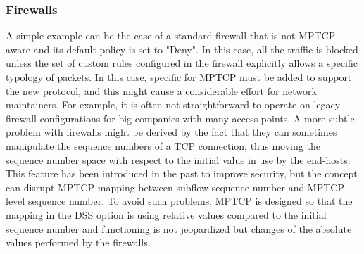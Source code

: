 \subsubsection{Firewalls}
A simple example can be the case of a standard firewall that is not MPTCP-aware and its default policy is set to "Deny". In this case, all the traffic is blocked unless the set of custom rules configured in the firewall explicitly allows a specific typology of packets. In this case, specific for MPTCP must be added to support the new protocol, and this might cause a considerable effort for network maintainers. For example, it is often not straightforward to operate on legacy firewall configurations for big companies with many access points.
A more subtle problem with firewalls might be derived by the fact that they can sometimes manipulate the sequence numbers of a TCP connection, thus moving the sequence number space with respect to the initial value in use by the end-hosts. This feature has been introduced in the past to improve security, but the concept can disrupt MPTCP mapping between subflow sequence number and MPTCP-level sequence number. To avoid such problems, MPTCP is designed so that the mapping in the DSS option is using relative values compared to the initial sequence number and functioning is not jeopardized but changes of the absolute values performed by the firewalls.

